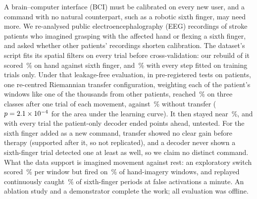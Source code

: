 A brain--computer interface (BCI) must be calibrated on every new user, and a command with no
natural counterpart, such as a robotic sixth finger, may need more. We re-analysed public
electroencephalography (EEG) recordings of \nSubjects{} stroke patients who imagined grasping
with the affected hand or flexing a sixth finger, and asked whether other patients' recordings shorten
calibration. The dataset's script fits its spatial filters
on every trial before cross-validation: our rebuild of it scored
\rqOneCspLdaReplicaPaperReplicaMean\,\% on hand against sixth finger, and
\rqOneCspLdaReplicaCvLeakfreeMean\,\% with every step fitted on training trials only. Under that
leakage-free evaluation, in pre-registered tests on \rqTwoHTwoAN{} patients, one re-centred
Riemannian transfer configuration, weighting each of the patient's windows like one of the
thousands from other patients, reached \rqTwoRestAhSfRctTslrKOneMean\,\% on three classes
after one trial of each movement, against \rqTwoRestAhSfTsLrKOneMean\,\% without transfer
($p = 2.1\times10^{-4}$ for the area under the learning curve). It then stayed near
\rqTwoRestAhSfRctTslrKAllMean\,\%, and with every trial the patient-only decoder ended
\rqTwoRestAhSfTsLrMinusRctTslrKAllDiff{} points ahead, untested. For the sixth finger added as a
new command, transfer showed no clear gain before therapy (supported after it, so not
replicated), and a decoder never shown a sixth-finger trial detected one at least as well, so we
claim no distinct command. What the data support is imagined movement against rest: an
exploratory switch scored \exFourTsLrCentralMean\,\% per window but fired on
\exFourTsLrCentralFiresAhMean\,\% of hand-imagery windows, and replayed continuously caught
\exFiveFingerFingerOnMean\,\% of sixth-finger periods at \exFiveFingerFalsePerMinMean{} false
activations a minute. An ablation study and a demonstrator complete the work; all evaluation was
offline.
